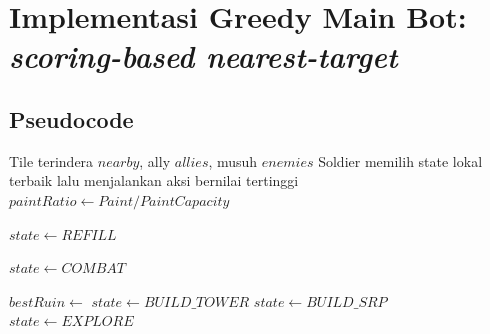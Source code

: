 
\section{Implementasi Greedy Main Bot: \textit{scoring-based nearest-target}}

\subsection{Pseudocode}

\begin{breakablealgorithm}
	\caption{Greedy State Selection dan Tower-First Expansion pada SoldierBot Main Bot}
	\label{alg:mainbot-soldier-state}
	\begin{algorithmic}[1]
		\Require Tile terindera $nearby$, ally $allies$, musuh $enemies$
		\Ensure Soldier memilih state lokal terbaik lalu menjalankan aksi bernilai tertinggi
		\State $paintRatio \gets Paint / PaintCapacity$

		\State $state \gets REFILL$
		\EndIf
		\EndIf

		\State $state \gets COMBAT$
		\EndIf

		\State $bestRuin \gets$ 
		\State $state \gets BUILD\_TOWER$
		\State $state \gets BUILD\_SRP$
		\Else
		\State $state \gets EXPLORE$
		\EndIf
		\EndIf

		\State {}
		\State {}
		\State {}
		\EndIf
		\State {}
		\EndFunction
	\end{algorithmic}
\end{breakablealgorithm}

